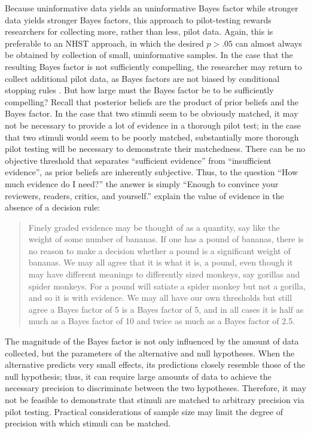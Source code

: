 \documentclass[fignum,nobf,man]{apa}
\begin{document}
Because uninformative data yields an uninformative Bayes factor while stronger data yields stronger Bayes factors, this approach to pilot-testing rewards researchers for collecting more, rather than less, pilot data. Again, this is preferable to an NHST approach, in which the desired $p > .05$ can almost always be obtained by collection of small, uninformative samples.  In the case that the resulting Bayes factor is not sufficiently compelling, the researcher may return to collect additional pilot data, as Bayes factors are not biased by conditional stopping rules \citep{Rouder:2014}. %
But how large must the Bayes factor be to be sufficiently compelling? Recall that posterior beliefs are the product of prior beliefs and the Bayes factor. In the case that two stimuli seem to be obviously matched, it may not be necessary to provide a lot of evidence in a thorough pilot test; in the case that two stimuli would seem to be poorly matched, substantially more thorough pilot testing will be necessary to demonstrate their matchedness.  There can be no objective threshold that separates ``sufficient evidence'' from ``insufficient evidence'', as prior beliefs are inherently subjective. %
Thus, to the question ``How much evidence do I need?'' the answer is simply ``Enough to convince your reviewers, readers, critics, and yourself.'' \citet[p. 12]{Rouder:etal:submitted} %
explain the value of evidence in the absence of a decision rule: 
\begin{quote}
Finely graded evidence may be thought of as a quantity, say like the weight of some number of bananas. If one has a pound of bananas, there is no reason to make a decision whether a pound is a significant weight of bananas. We may all agree that it is what it is, a pound, even though it may have different meanings to differently sized monkeys, say gorillas and spider monkeys. For a pound will satiate a spider monkey but not a gorilla, and so it is with evidence. We may all have our own thresholds but still agree a Bayes factor of 5 is a Bayes factor of 5, and in all cases it is half as much as a Bayes factor of 10 and twice as much as a Bayes factor of 2.5.
\end{quote}

The magnitude of the Bayes factor is not only influenced by the amount of data collected, but the parameters of the alternative and null hypotheses. When the alternative predicts very small effects, its predictions closely resemble those of the null hypothesis; thus, it can require large amounts of data to achieve the necessary precision to discriminate between the two hypotheses. Therefore, it may not be feasible to demonstrate that stimuli are matched to arbitrary precision via pilot testing.  Practical considerations of sample size may limit the degree of precision with which stimuli can be matched.
\end{document}
